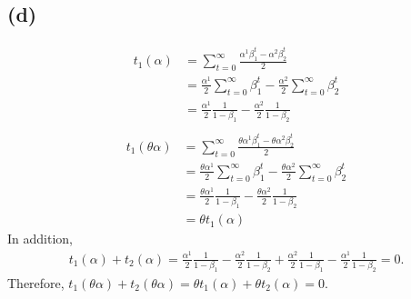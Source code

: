 \documentclass[a4paper]{article}
\begin{document}
\subsection*{(d)}
\begin{align*}
    t_1 (\alpha)
    &= \sum_{t=0}^{\infty} \frac{\alpha^1 \beta_1^t - \alpha^2 \beta_2^t}{2}\\
    &= \frac{\alpha^1}{2} \sum_{t=0}^{\infty} \beta_1^t - \frac{\alpha^2}{2} \sum_{t=0}^{\infty} \beta_2^t\\
    &= \frac{\alpha^1}{2} \frac{1}{1-\beta_1} - \frac{\alpha^2}{2} \frac{1}{1-\beta_2}\\
\end{align*}
\begin{align*}
    t_1 (\theta \alpha)
    &= \sum_{t=0}^{\infty} \frac{\theta \alpha^1 \beta_1^t - \theta \alpha^2 \beta_2^t}{2}\\
    &= \frac{\theta \alpha^1}{2} \sum_{t=0}^{\infty} \beta_1^t - \frac{\theta \alpha^2}{2} \sum_{t=0}^{\infty} \beta_2^t\\
    &= \frac{\theta \alpha^1}{2} \frac{1}{1-\beta_1} - \frac{\theta \alpha^2}{2} \frac{1}{1-\beta_2}\\
    &= \theta t_1 (\alpha)
\end{align*}
In addition, 
\begin{gather*}
    t_1 (\alpha) + t_2 (\alpha) = \frac{\alpha^1}{2} \frac{1}{1-\beta_1} - \frac{\alpha^2}{2} \frac{1}{1-\beta_2} + \frac{\alpha^2}{2} \frac{1}{1-\beta_1} - \frac{\alpha^1}{2} \frac{1}{1-\beta_2} = 0.
\end{gather*}
Therefore, $t_1 (\theta \alpha) + t_2 (\theta \alpha) = \theta t_1 (\alpha) + \theta t_2 (\alpha) = 0$.
\end{document}
